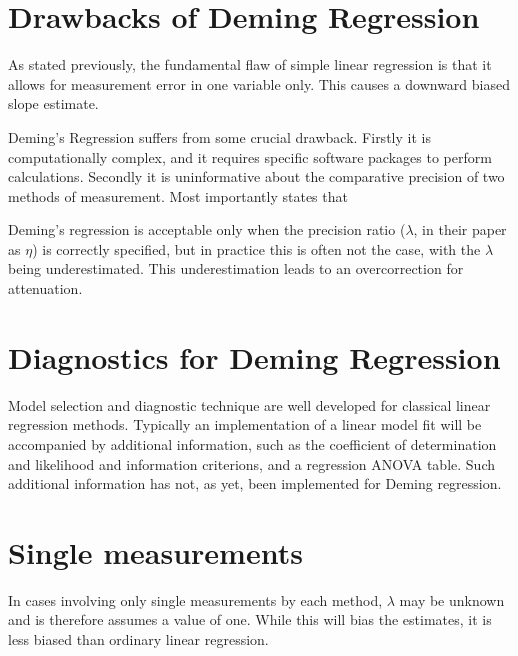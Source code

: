 \documentclass[12pt, a4paper]{report}
\theoremstyle{plain}
\theoremstyle{definition}
\theoremstyle{remark}
\begin{document}


\section{Drawbacks of Deming Regression}

As stated previously, the fundamental flaw of simple linear regression is that it allows for measurement error in one variable only. This causes a downward biased slope estimate.

Deming's Regression suffers from some crucial drawback. Firstly it is computationally complex, and it requires specific software packages to perform calculations. Secondly it is uninformative
about the comparative precision of two methods of measurement. Most importantly \citet{CarollRupert} states that

Deming's regression is acceptable only when the precision ratio ($\lambda$, in their paper as $\eta$) is correctly specified, but in practice this is often not the case, with the $\lambda$ being underestimated. This underestimation leads to an overcorrection for attenuation.

\section{Diagnostics for Deming Regression}
Model selection and diagnostic technique are well developed for classical linear regression methods.
Typically an implementation of a linear model fit will be accompanied by additional information, such as the coefficient of determination and likelihood and information criterions, and a regression ANOVA table. Such additional information has not, as yet, been implemented for Deming regression.



\section{Single measurements}
In cases involving only single measurements by each method, $\lambda$ may be unknown and is therefore assumes a value of one. While this will bias the estimates, it is less biased than ordinary linear regression.

\end{document}

